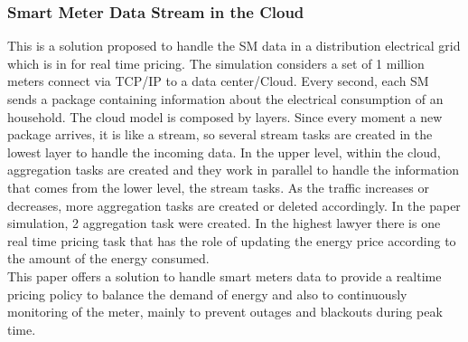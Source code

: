 \subsubsection{Smart Meter Data Stream in the Cloud}
This is a solution proposed to handle the SM data in a distribution electrical grid which is in
\cite{lohrmann2011processing} for real time pricing. The simulation considers a set of 1 million meters connect via TCP/IP to a data center/Cloud. Every second, each SM sends a package containing information about the electrical consumption of an household. The cloud model is composed by layers. Since every moment a new package arrives, it is like a stream, so several stream tasks are created in the lowest layer to handle the incoming data. In the upper level, within the cloud, aggregation tasks are created and they work in parallel to handle the information that comes from the lower level, the stream tasks. As the traffic increases or decreases, more aggregation tasks are created or deleted accordingly. In the paper simulation, 2 aggregation task were created. In the highest lawyer there is one real time pricing task that has the role of updating the energy price according to the amount of the energy consumed.\\
This paper offers a solution to handle smart meters data to provide a real­time pricing policy to balance the
demand of energy and also to continuously monitoring of the meter, mainly to prevent outages and blackouts during peak time.
